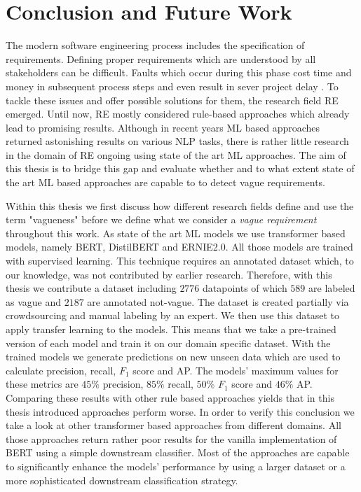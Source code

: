 \chapter{Conclusion and Future Work}
\label{chp:conclusion_and_future_work}
The modern software engineering process includes the specification of requirements.
Defining proper requirements which are understood by all stakeholders can be difficult.
Faults which occur during this phase cost time and money in subsequent process steps \parencite{Mendez:2016} and even result in sever project delay \parencite{Femmer:2014}.
To tackle these issues and offer possible solutions for them, the research field \ac{RE} emerged.
Until now, \ac{RE} mostly considered rule-based approaches which already lead to promising results.
Although in recent years \ac{ML} based approaches returned astonishing results on various \ac{NLP} tasks, there is rather little research in the domain of \ac{RE} ongoing using state of the art \ac{ML} approaches.
The aim of this thesis is to bridge this gap and evaluate whether and to what extent state of the art \ac{ML} based approaches are capable to to detect vague requirements.

Within this thesis we first discuss how different research fields define and use the term "vagueness" before we define what we consider a \textit{vague requirement} throughout this work.
As state of the art \ac{ML} models we use transformer based models, namely \ac{BERT}, \ac{DistilBERT} and \ac{ERNIE2.0}.
All those models are trained with supervised learning.
This technique requires an annotated dataset which, to our knowledge, was not contributed by earlier research.
Therefore, with this thesis we contribute a dataset including $2776$ datapoints of which $589$ are labeled as vague and $2187$ are annotated not-vague.
The dataset is created partially via crowdsourcing and manual labeling by an expert.
We then use this dataset to apply transfer learning to the models.
This means that we take a pre-trained version of each model and train it on our domain specific dataset.
With the trained models we generate predictions on new unseen data which are used to calculate precision, recall, $F_1$ score and \ac{AP}.
The models' maximum values for these metrics are $45\%$ precision, $85\%$ recall, $50\%$ $F_1$ score and $46\%$ \ac{AP}.
Comparing these results with other rule based approaches yields that in this thesis introduced approaches perform worse.
In order to verify this conclusion we take a look at other transformer based approaches from different domains.
All those approaches return rather poor results for the vanilla implementation of \ac{BERT} using a simple downstream classifier.
Most of the approaches are capable to significantly enhance the models' performance by using a larger dataset or a more sophisticated downstream classification strategy.

